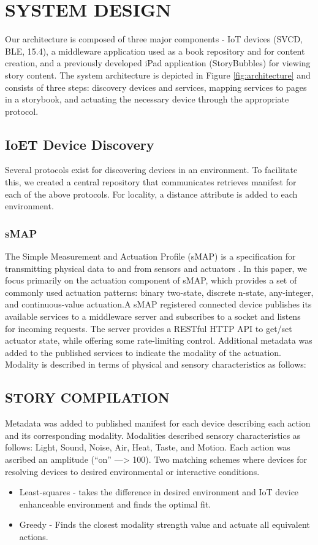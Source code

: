 \documentclass{sigchi}
\newcommand*{\quoted}[1]{{\small{\fontfamily{cmss}\selectfont{#1}}}}
\begin{document}
\section{SYSTEM DESIGN}
Our architecture is composed of three major components - IoT devices (SVCD, BLE, 15.4), a middleware application used as a book repository and for content creation, and a previously developed iPad application (StoryBubbles) for viewing story content. The system architecture is depicted in Figure \ref{fig:architecture} and consists of three steps: discovery devices and services, mapping services to pages in a storybook, and actuating the necessary device through the appropriate protocol. 

\subsection{IoET Device Discovery} 
Several protocols exist for discovering devices in an environment. To facilitate this, we created a central repository that communicates retrieves manifest for each of the above protocols. For locality, a distance attribute is added to each environment.


\subsubsection{sMAP}
The Simple Measurement and Actuation Profile (sMAP) is a specification for transmitting physical data to and from sensors and actuators  \cite{dawson-haggerty_smap:_2010}. In this paper, we focus primarily on the actuation component of sMAP, which provides a set of commonly used actuation patterns: binary two-state, discrete n-state, any-integer, and continuous-value actuation.A sMAP registered connected device publishes its available services to a middleware server and subscribes to a socket and listens for incoming requests. The server provides a RESTful HTTP API to get/set actuator state, while offering some rate-limiting control. Additional metadata was added to the published services to indicate the modality of the actuation. Modality is described in terms of physical and sensory characteristics as follows: 
\quoted{Light, Air, Sound, Small, Heat, Taste, Motion.}

\subsection{STORY COMPILATION}
Metadata was added to published manifest for each device describing each action and its corresponding modality. Modalities described sensory characteristics as follows: Light, Sound, Noise, Air, Heat, Taste, and Motion. Each action was ascribed an amplitude (“on” —> 100). 
Two matching schemes where devices for resolving devices to desired environmental or interactive conditions. 
\begin{itemize}
\item Least-squares - takes the difference in desired environment and IoT device enhanceable environment and finds the optimal fit. 

\item Greedy - Finds the closest modality strength value and actuate all equivalent actions. 
\end{itemize}
\end{document}
